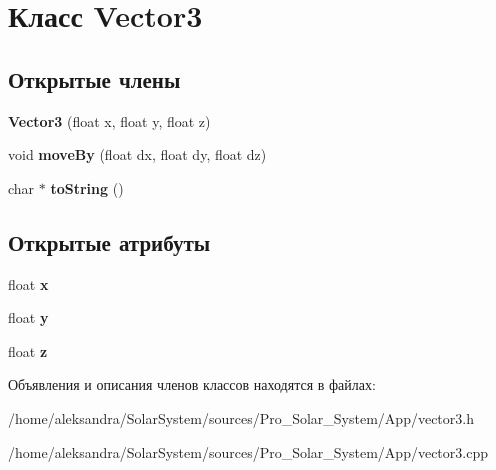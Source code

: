 \hypertarget{classVector3}{\section{Класс Vector3}
\label{classVector3}
}
\subsection*{Открытые члены}
\begin{DoxyCompactItemize}
\item 
\hypertarget{classVector3_ad53e22b52babdb90d423601f72467590}{{\bfseries Vector3} (float x, float y, float z)}\label{classVector3_ad53e22b52babdb90d423601f72467590}

\item 
\hypertarget{classVector3_a1d953e115cab3dab5d0bd7c9ffa8b92a}{void {\bfseries move\-By} (float dx, float dy, float dz)}\label{classVector3_a1d953e115cab3dab5d0bd7c9ffa8b92a}

\item 
\hypertarget{classVector3_a51990bce248a788a55830afbc9b6b9d9}{char $\ast$ {\bfseries to\-String} ()}\label{classVector3_a51990bce248a788a55830afbc9b6b9d9}

\end{DoxyCompactItemize}
\subsection*{Открытые атрибуты}
\begin{DoxyCompactItemize}
\item 
\hypertarget{classVector3_a7e2d3237b29a2f29d7b3d8b2934e35f2}{float {\bfseries x}}\label{classVector3_a7e2d3237b29a2f29d7b3d8b2934e35f2}

\item 
\hypertarget{classVector3_a86eb35a9fa2d5a49e7fad66a35fa9c13}{float {\bfseries y}}\label{classVector3_a86eb35a9fa2d5a49e7fad66a35fa9c13}

\item 
\hypertarget{classVector3_aa8c9461eb24bd2c364258078811a3e9d}{float {\bfseries z}}\label{classVector3_aa8c9461eb24bd2c364258078811a3e9d}

\end{DoxyCompactItemize}


Объявления и описания членов классов находятся в файлах\-:\begin{DoxyCompactItemize}
\item 
/home/aleksandra/\-Solar\-System/sources/\-Pro\-\_\-\-Solar\-\_\-\-System/\-App/vector3.\-h\item 
/home/aleksandra/\-Solar\-System/sources/\-Pro\-\_\-\-Solar\-\_\-\-System/\-App/vector3.\-cpp\end{DoxyCompactItemize}
